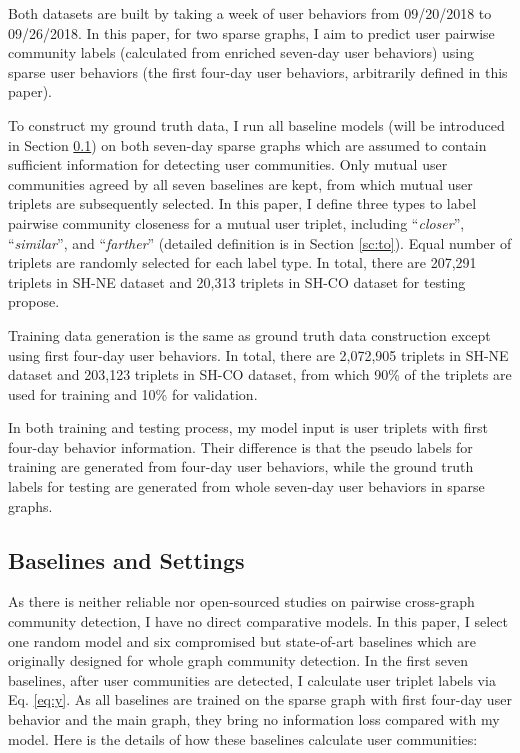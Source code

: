 Both datasets are built by taking a week of user behaviors from 09/20/2018 to 09/26/2018. In this paper, for two sparse graphs, I aim to predict user pairwise community labels (calculated from enriched seven-day user behaviors) using sparse user behaviors (the first four-day user behaviors, arbitrarily defined in this paper).

To construct my ground truth data, I run all baseline models (will be introduced in Section \ref{sc:baseline}) on both seven-day sparse graphs which are assumed to contain sufficient information for detecting user communities. Only mutual user communities agreed by all seven baselines are kept, from which mutual user triplets are subsequently selected. In this paper, I define three types to label pairwise community closeness for a mutual user triplet, including ``\textit{closer}'', ``\textit{similar}'', and ``\textit{farther}'' (detailed definition is in Section \ref{sc:to}). Equal number of triplets are randomly selected for each label type. In total, there are 207,291 triplets in SH-NE dataset and 20,313 triplets in SH-CO dataset for testing propose. 

Training data generation is the same as ground truth data construction except using first four-day user behaviors. In total, there are 2,072,905 triplets in SH-NE dataset and  203,123 triplets in SH-CO dataset, from which 90\% of the triplets are used for training and 10\% for validation.

In both training and testing process, my model input is user triplets with first four-day behavior information. Their difference is that the pseudo labels for training are generated from four-day user behaviors, while the ground truth labels for testing are generated from whole seven-day user behaviors in sparse graphs.


\subsection{Baselines and Settings} \label{sc:baseline}
As there is neither reliable nor open-sourced studies on pairwise cross-graph community detection, I have no direct comparative models. In this paper, I select one random model and six compromised but state-of-art baselines which are originally designed for whole graph community detection. In the first seven baselines, after user communities are detected, I calculate user triplet labels via Eq. \ref{eq:y}. As all baselines are trained on the sparse graph with first four-day user behavior and the main graph, they bring no information loss compared with my model. Here is the details of how these baselines calculate user communities:

